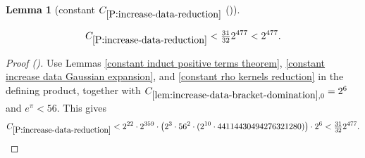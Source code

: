 \documentclass[12pt,reqno]{amsart}
\newcommand{\auto}{{({\tiny\faCar})}}
\theoremstyle{plain}
\newtheorem{lemma}[theorem]{Lemma}
\numberwithin{equation}{section}
\theoremstyle{remark}
\newcommand{\uses}[1]{}
\newcommand{\usesdefs}[1]{}
\newcommand{\leanok}{}
\newcommand{\lean}[1]{}
\begin{document}
\begin{lemma}[constant $C_{\ref{P:increase-data-reduction}}$ \auto]\label{constant increase data reduction}\uses{constant induct positive terms theorem,constant increase data Gaussian expansion,constant rho kernels reduction,lem:increase-data-bracket-domination,P:increase-data-reduction}\usesdefs{}
\lean{Auto.constantIncreaseDataReduction}
\leanok
\begin{equation}\label{constant increase data reduction bound}
C_{\ref{P:increase-data-reduction}}
<\tfrac{31}{32}2^{477}<2^{477}.
\end{equation}
\end{lemma}
\begin{proof}[Proof \auto]
Use Lemmas \ref{constant induct positive terms theorem}, \ref{constant increase data Gaussian expansion}, and \ref{constant rho kernels reduction} in the defining product, together with $C_{\ref{lem:increase-data-bracket-domination},0}=2^6$ and $e^\pi<56$. This gives
\[
C_{\ref{P:increase-data-reduction}}
<2^{22}\cdot2^{359}\cdot\bigl(2^3\cdot56^2\cdot(2^{10}\cdot44114430494276321280)\bigr)\cdot2^6
<\tfrac{31}{32}2^{477}.
\]
\end{proof}
\end{document}
